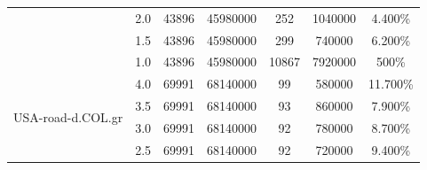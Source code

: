 \begin{table}[H]
\begin{adjustbox}{max width=\textwidth}
\begin{tabular}{|c|c|c|c|c|c|c|}
                                   & 2.0                                     & 43896                                & 45980000                                     & 252                                    & 1040000                                        & 4.400\%                                                        \\ \cline{2-7} 
                                   & 1.5                                     & 43896                                & 45980000                                     & 299                                    & 740000                                         & 6.200\%                                                        \\ \cline{2-7} 
                                   & 1.0                                     & 43896                                & 45980000                                     & 10867                                  & 7920000                                        & 500\%                                                          \\ \hline
\multirow{7}{*}{USA-road-d.COL.gr} & 4.0                                     & 69991                                & 68140000                                     & 99                                     & 580000                                         & 11.700\%                                                       \\ \cline{2-7} 
                                   & 3.5                                     & 69991                                & 68140000                                     & 93                                     & 860000                                         & 7.900\%                                                        \\ \cline{2-7} 
                                   & 3.0                                     & 69991                                & 68140000                                     & 92                                     & 780000                                         & 8.700\%                                                        \\ \cline{2-7} 
                                   & 2.5                                     & 69991                                & 68140000                                     & 92                                     & 720000                                         & 9.400\%                                                        \\ \cline{2-7} 

\end{tabular}
\end{adjustbox}
\end{table}
